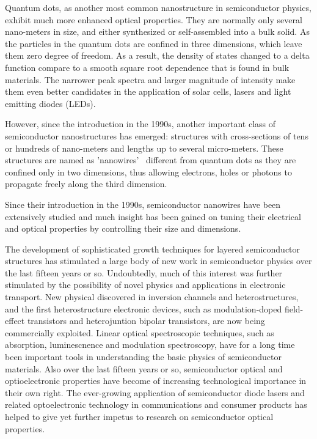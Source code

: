 Quantum dots, as another most common nanostructure in semiconductor physics,
exhibit much more enhanced optical properties. They are normally only several
nano-meters in size, and either synthesized or self-assembled into a bulk
solid. As the particles in the quantum dots are confined in three dimensions,
which leave them zero degree of freedom. As a result, the density of states
changed to a delta function compare to a smooth square root dependence that is
found in bulk materials. The narrower peak spectra and larger magnitude of
intensity make them even better candidates in the application of solar cells,
lasers and light emitting diodes (LEDs).

However, since the introduction in the 1990s, another important class of
semiconductor nanostructures has emerged: structures with cross-sections of
tens or hundreds of nano-meters and lengths up to several micro-meters. These
structures are named as 'nanowires'~\cite{xia2003one} different from quantum
dots as they are confined only in two dimensions, thus allowing electrons,
holes or photons to propagate freely along the third dimension. 

Since their introduction in the 1990s, semiconductor nanowires have been
extensively studied and much insight has been gained on tuning their electrical
and optical properties by controlling their size and dimensions. 

The development of sophisticated growth techniques for layered semiconductor
structures has stimulated a large body of new work in semiconductor physics
over the last fifteen years or so. Undoubtedly, much of this interest was
further stimulated by the possibility of novel physics and applications in
electronic transport. New physical discovered in inversion channels and
heterostructures, and the first heterostructure electronic devices, such as
modulation-doped field-effect transistors and heterojuntion bipolar
transistors, are now being commercially exploited. Linear optical spectroscopic
techniques, such as absorption, luminescnence and modulation spectroscopy, have
for a long time been important tools in understanding the basic physics of
semiconductor materials. Also over the last fifteen years or so, semiconductor
optical and optioelectronic properties have become of increasing technological
importance in their own right. The ever-growing application of semiconductor
diode lasers and related optoelectronic technology in communications and
consumer products has helped to give yet further impetus to research on
semiconductor optical properties. 

